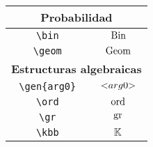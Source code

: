 \begin{longtable}{|c|c|}
\multicolumn{2}{|c|}{\textbf{Probabilidad}} \\ \hline 
\verb|\bin| & $\displaystyle\operatorname{Bin}$ \\ \hline 
\verb|\geom| & $\displaystyle\operatorname{Geom}$ \\ \hline 
\multicolumn{2}{|c|}{\textbf{Estructuras algebraicas}} \\ \hline 
\verb|\gen{arg0}| & $\displaystyle\mathopen{<} arg0 \mathclose{>}$ \\ \hline 
\verb|\ord| & $\displaystyle\operatorname{ord}$ \\ \hline 
\verb|\gr| & $\displaystyle\operatorname{gr}$ \\ \hline 
\verb|\kbb| & $\displaystyle\mathbb{K}$ \\ \hline 
\end{longtable}